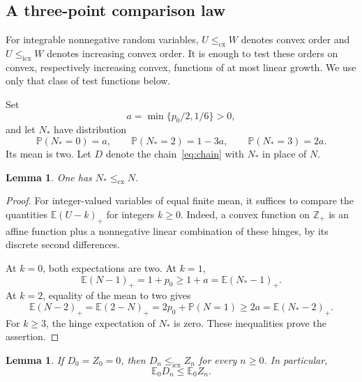 \documentclass[11pt]{amsart}
\numberwithin{equation}{section}
\newtheorem{lemma}[theorem]{Lemma}
\theoremstyle{remark}
\newcommand{\E}{\mathbb E}
\newcommand{\Pp}{\mathbb P}
\newcommand{\Z}{\mathbb Z}
\newcommand{\cx}{\le_{\mathrm{cx}}}
\newcommand{\icx}{\le_{\mathrm{icx}}}
\begin{document}
\subsection{A three-point comparison law}

For integrable nonnegative random variables, $U\cx W$ denotes convex order and $U\icx W$ denotes increasing convex order. It is enough to test these orders on convex, respectively increasing convex, functions of at most linear growth. We use only that class of test functions below.

Set
\begin{equation}\label{eq:a}
 a=\min\{p_0/2,1/6\}>0,
\end{equation}
and let $N_*$ have distribution
\begin{equation}\label{eq:Nstar}
 \Pp(N_*=0)=a,\qquad
 \Pp(N_*=2)=1-3a,\qquad
 \Pp(N_*=3)=2a.
\end{equation}
Its mean is two. Let $D$ denote the chain~\eqref{eq:chain} with $N_*$ in place of $N$.

\begin{lemma}\label{lem:convexorder}
One has $N_*\cx N$.
\end{lemma}

\begin{proof}
For integer-valued variables of equal finite mean, it suffices to compare the quantities $\E(U-k)_+$ for integers $k\ge0$. Indeed, a convex function on $\Z_+$ is an affine function plus a nonnegative linear combination of these hinges, by its discrete second differences.

At $k=0$, both expectations are two. At $k=1$,
\[
 \E(N-1)_+=1+p_0\ge1+a=\E(N_*-1)_+.
\]
At $k=2$, equality of the mean to two gives
\[
 \E(N-2)_+=\E(2-N)_+
 =2p_0+\Pp(N=1)\ge2a=\E(N_*-2)_+.
\]
For $k\ge3$, the hinge expectation of $N_*$ is zero. These inequalities prove the assertion.
\end{proof}

\begin{lemma}\label{lem:kernels}
If $D_0=Z_0=0$, then $D_n\icx Z_n$ for every $n\ge0$. In particular,
\begin{equation}\label{eq:meancompare}
 \E_0D_n\le\E_0Z_n.
\end{equation}
\end{lemma}
\end{document}
